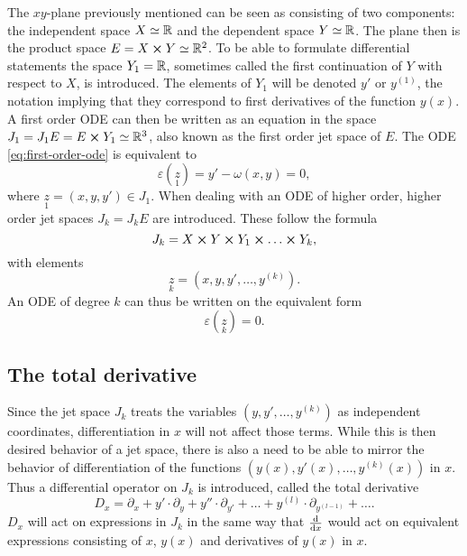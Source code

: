 The \(xy\)-plane previously mentioned can be seen as consisting of two components: the independent space \(X \simeq \mathbb{R}\) and the dependent space \(Y \simeq \mathbb{R}\).
The plane then is the product space \(E = X \cross Y \simeq \mathbb{R}^2\).
To be able to formulate differential statements the space \(Y_1 = \mathbb{R}\), sometimes called the first continuation of \(Y\) with respect to \(X\), is introduced.
The elements of \(Y_1\) will be denoted \(y'\) or \(y^{(1)}\), the notation implying that they correspond to first derivatives of the function \(y(x)\).
A first order ODE can then be written as an equation in the space \(J_1 = J_1 E = E \cross Y_1 \simeq \mathbb{R}^3\), also known as the first order jet space of \(E\).
The ODE \ref{eq:first-order-ode} is equivalent to
\begin{equation} \label{eq:first-order-jet-ode}
  \varepsilon(\underset{1}{z}) = y' - \omega(x,y) = 0,
\end{equation}
where \(\underset{1}{z} = (x,y,y') \in J_1\).
When dealing with an ODE of higher order, higher order jet spaces \(J_k = J_k E\) are introduced.
These follow the formula
\begin{equation}
  J_k = X \cross Y \cross Y_1 \cross \dots \cross Y_k,
\end{equation}
with elements
\begin{equation}
  \underset{k}{z} = (x, y, y', \dots, y^{(k)}).
\end{equation}
An ODE of degree \(k\) can thus be written on the equivalent form
\begin{equation}
  \varepsilon(\underset{k}{z}) = 0.
\end{equation}

\subsection{The total derivative}

Since the jet space \(J_k\) treats the variables \((y, y', \dots, y^{(k)})\) as independent coordinates, differentiation in \(x\) will not affect those terms.
While this is then desired behavior of a jet space, there is also a need to be able to mirror the behavior of differentiation of the functions \((y(x), y'(x), \dots, y^{(k)}(x))\) in \(x\).
Thus a differential operator on \(J_k\) is introduced, called the total derivative
\begin{equation}
  D_x = \partial_x + y' \cdot \partial_y + y'' \cdot \partial_{y'} + \dots + y^{(l)} \cdot \partial_{y^{(l-1)}} + \dots .
\end{equation}
\(D_x\) will act on expressions in \(J_k\) in the same way that \(\dv{x}\) would act on equivalent expressions consisting of \(x\), \(y(x)\) and derivatives of \(y(x)\) in \(x\).

